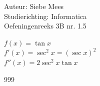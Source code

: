 \documentclass[a4paper]{article}
\begin{document}
  
\noindent \large Auteur: Siebe Mees \\
\noindent \large Studierichting: Informatica\\
\noindent \large Oefeningenreeks 3B nr. 1.5\\

\medskip

\normalsize

$f(x) = \tan x$\\

$f'(x) = \sec^2 x = (\sec x)^2$\\

$f''(x) = 2\sec^2 x \tan x$\\

\begin{thebibliography}{999}
\end{thebibliography}
\end{document}

